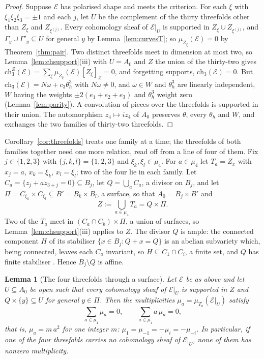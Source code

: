 \documentclass[11pt,reqno]{amsart}
\numberwithin{equation}{section}
\theoremstyle{plain}
\newtheorem{lemma}[theorem]{Lemma}
\theoremstyle{definition}
\newcommand{\ch}{\mathrm{ch}}
\begin{document}
\begin{proof}
Suppose $\mathcal{E}$ has polarised shape and meets the criterion. For each $\xi$ with $\xi_{1}\xi_{2}\xi_{3}=\pm1$ and each $j$, let $U$ be the complement of the thirty threefolds other than $Z_{\xi}$ and $Z_{\xi^{(j)}}$. Every cohomology sheaf of $\mathcal{E}|_{U}$ is supported in $Z_{\xi}\cup Z_{\xi^{(j)}}$, and $\Gamma_{y}\cup\Gamma'_{y}\subseteq U$ for general $y$ by Lemma~\ref{lem:curvesT}; so $\mu_{Z_{\xi}}(\mathcal{E})=0$ by Theorem~\ref{thm:pair}. Two distinct threefolds meet in dimension at most two, so Lemma~\ref{lem:chsupport}(iii) with $U=A_{0}$ and $Z$ the union of the thirty-two gives $\ch^{Z}_{3}(\mathcal{E})=\sum_{\xi}\mu_{Z_{\xi}}(\mathcal{E})[Z_{\xi}]_{Z}=0$, and forgetting supports, $\ch_{3}(\mathcal{E})=0$. But $\ch_{3}(\mathcal{E})=N\omega+c_{3}\theta_{h}^{3}$ with $N\omega\ne0$, and $\omega\in W$ and $\theta_{h}^{3}$ are linearly independent, $W$ having the weights $\pm2(e_{1}+e_{2}+e_{3})$ and $\theta_{h}^{3}$ weight zero (Lemma~\ref{lem:parity}). A convolution of pieces over the threefolds is supported in their union. The automorphism $z_{4}\mapsto iz_{4}$ of $A_{0}$ preserves $\theta$, every $\theta_{h}$ and $W$, and exchanges the two families of thirty-two threefolds.
\end{proof}

Corollary~\ref{cor:threefolds} treats one family at a time; the threefolds of both families together need one more relation, read off from a line of four of them. Fix $j\in\{1,2,3\}$ with $\{j,k,l\}=\{1,2,3\}$ and $\xi_{k},\xi_{l}\in\mu_{4}$. For $a\in\mu_{4}$ let $T_{a}=Z_{x}$ with $x_{j}=a$, $x_{k}=\xi_{k}$, $x_{l}=\xi_{l}$; two of the four lie in each family. Let $C_{a}=\{z_{j}+az_{3+j}=0\}\subseteq B_{j}$, let $Q=\bigcup_{a}C_{a}$, a divisor on $B_{j}$, and let $\Pi=C_{\xi_{k}}\times C_{\xi_{l}}\subseteq B'=B_{k}\times B_{l}$, a surface, so that $A_{0}=B_{j}\times B'$ and
\[
Z:=\bigcup_{a\in\mu_{4}}T_{a}=Q\times\Pi .
\]
Two of the $T_{a}$ meet in $(C_{a}\cap C_{b})\times\Pi$, a union of surfaces, so Lemma~\ref{lem:chsupport}(iii) applies to $Z$. The divisor $Q$ is ample: the connected component $H$ of its stabiliser $\{x\in B_{j}:Q+x=Q\}$ is an abelian subvariety which, being connected, leaves each $C_{a}$ invariant, so $H\subseteq C_{1}\cap C_{i}$, a finite set, and $Q$ has finite stabiliser \cite[\S6, Application~1]{Mum70}. Hence $B_{j}\setminus Q$ is affine.

\begin{lemma}[The four threefolds through a surface]\label{lem:fourline}
Let $\mathcal{E}$ be as above and let $U\subseteq A_{0}$ be open such that every cohomology sheaf of $\mathcal{E}|_{U}$ is supported in $Z$ and $Q\times\{y\}\subseteq U$ for general $y\in\Pi$. Then the multiplicities $\mu_{a}=\mu_{T_{a}}(\mathcal{E}|_{U})$ satisfy
\[
\sum_{a\in\mu_{4}}\mu_{a}=0,\qquad\sum_{a\in\mu_{4}}a\,\mu_{a}=0,
\]
that is, $\mu_{a}=m\,a^{2}$ for one integer $m$: $\mu_{1}=\mu_{-1}=-\mu_{i}=-\mu_{-i}$. In particular, if one of the four threefolds carries no cohomology sheaf of $\mathcal{E}|_{U}$, none of them has nonzero multiplicity.
\end{lemma}
\end{document}
